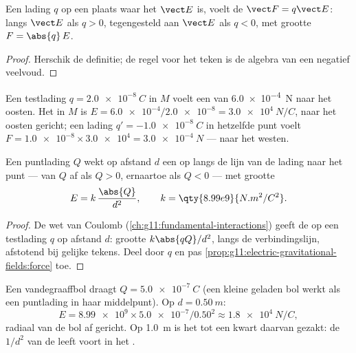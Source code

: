 \begin{proposition}\label{prop:g11:electric-gravitational-fields:force}
Een lading $q$ op een plaats waar het  $\vect E$ is, voelt de 
$\vect F = q \vect E$: langs $\vect E$ als $q > 0$, tegengesteld aan
$\vect E$ als $q < 0$, met grootte $F = \abs{q}\,E$.
\end{proposition}

\begin{proof}
Herschik de definitie; de regel voor het teken is de algebra van een
negatief veelvoud.
\end{proof}

\begin{example}\label{ex:g11:electric-gravitational-fields:reading}
Een testlading $q = \qty{+2.0e-8}{C}$ in $M$ voelt een  van
\qty{6.0e-4}{N} naar het oosten. Het  in $M$ is
$E = \num{6.0e-4} / \num{2.0e-8} = \qty{3.0e4}{N/C}$, naar het oosten
gericht; een lading $q' = \qty{-1.0e-8}{C}$ in hetzelfde punt voelt
$F = \num{1.0e-8} \times \num{3.0e4} = \qty{3.0e-4}{N}$ --- naar het
westen.
\end{example}

\begin{proposition}\label{prop:g11:electric-gravitational-fields:point}
Een puntlading $Q$ wekt op afstand $d$ een  op langs de lijn van de
lading naar het punt --- van $Q$ af als $Q > 0$, ernaartoe als $Q < 0$
--- met grootte
\[
E = k\,\frac{\abs{Q}}{d^2},
\qquad k = \qty{8.99e9}{N.m^2/C^2}.
\]
\end{proposition}

\begin{proof}
De wet van Coulomb (\cref{ch:g11:fundamental-interactions}) geeft de
 op een testlading $q$ op afstand $d$: grootte
$k \abs{qQ} / d^2$, langs de verbindingslijn, afstotend bij gelijke
tekens. Deel door $q$ en pas
\cref{prop:g11:electric-gravitational-fields:force} toe.
\end{proof}

\begin{example}\label{ex:g11:electric-gravitational-fields:sphere}
Een vandegraaffbol draagt $Q = \qty{+5.0e-7}{C}$ (een kleine geladen bol
werkt als een puntlading in haar middelpunt). Op $d = \qty{0.50}{m}$:
\[
E = \num{8.99e9} \times \num{5.0e-7} / 0.50^2 \approx \qty{1.8e4}{N/C},
\]
radiaal van de bol af gericht. Op \qty{1.0}{m} is het tot een kwart
daarvan gezakt: de $1/d^2$ van de  leeft voort in het .
\end{example}

